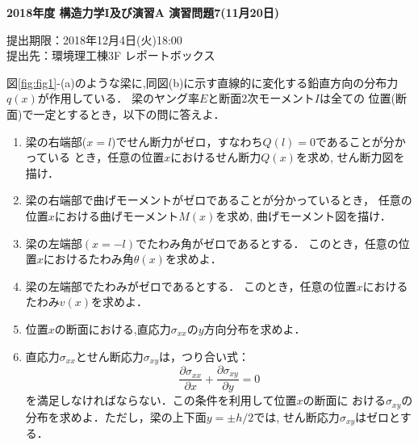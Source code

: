 \documentclass[10pt,a4j]{jarticle}
\newlength{\minitwocolumn}
\begin{document}
\newcommand{\fat}[1]{\mbox{\boldmath $#1$}}
\newcommand{\D}{\partial}
\newcommand{\w}{\omega}
\newcommand{\ga}{\alpha}
\newcommand{\gb}{\beta}
\newcommand{\gx}{\xi}
\newcommand{\gz}{\zeta}
\newcommand{\vhat}[1]{\hat{\fat{#1}}}
\newcommand{\spc}{\vspace{0.7\baselineskip}}
\newcommand{\halfspc}{\vspace{0.3\baselineskip}}

\pagestyle{empty}
\newcommand{\twofig}[2]
 {
   \begin{figure}[here]
     \begin{minipage}[t]{\minitwocolumn}
         \begin{center}   #1
         \end{center}
     \end{minipage}
         \hspace{\columnsep}
     \begin{minipage}[t]{\minitwocolumn}
         \begin{center} #2
         \end{center}
     \end{minipage}
   \end{figure}
 }
\begin{center}
{\Large \bf 2018年度 構造力学I及び演習A 演習問題7(11月20日)} \\
\end{center}
\begin{flushright}
提出期限：2018年12月4日(火)18:00\\
提出先：環境理工棟3F レポートボックス
\end{flushright}
\vspace{15mm}
図\ref{fig:fig1}-(a)のような梁に,同図(b)に示す直線的に変化する鉛直方向の分布力
$q(x)$が作用している． 梁のヤング率$E$と断面2次モーメント$I$は全ての
位置(断面)で一定とするとき，以下の問に答えよ．
\begin{enumerate}
\item
	梁の右端部($x=l$)でせん断力がゼロ，すなわち$Q(l)=0$であることが分かっている
	とき，任意の位置$x$におけるせん断力$Q(x)$を求め, せん断力図を描け．
\item
	梁の右端部で曲げモーメントがゼロであることが分かっているとき，
	任意の位置$x$における曲げモーメント$M(x)$を求め, 曲げモーメント図を描け．
\item
	梁の左端部$\left(x=-l\right)$でたわみ角がゼロであるとする．
	このとき，任意の位置$x$におけるたわみ角$\theta(x)$を求めよ．
\item
	梁の左端部でたわみがゼロであるとする．
	このとき，任意の位置$x$におけるたわみ$v(x)$を求めよ．
\item
	位置$x$の断面における,直応力$\sigma_{xx}$の$y$方向分布を求めよ．     
\item
	直応力$\sigma_{xx}$とせん断応力$\sigma_{xy}$は，つり合い式：
	\[
		\frac{\partial \sigma_{xx}}{\partial x}
		+
		\frac{\partial \sigma_{xy}}{\partial y}
		=0
	\]
	を満足しなければならない．この条件を利用して位置$x$の断面に
	おける$\sigma_{xy}$の分布を求めよ．ただし，梁の上下面$y=\pm h/2$では, 
	せん断応力$\sigma_{xy}$はゼロとする．
\end{enumerate}
\end{document}
